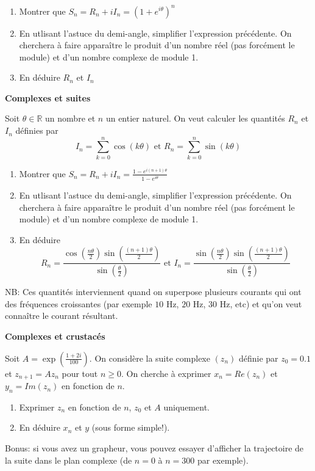 \documentclass[a4paper,12pt]{article}\usepackage[]{graphicx}\usepackage[]{color}
\begin{document}
\begin{enumerate}
\item Montrer que $\displaystyle S_n = R_n + i I_n = (1+e^{i\theta})^n$
\item En utlisant l'astuce du demi-angle, simplifier l'expression précédente. On cherchera à faire apparaître le produit d'un nombre réel (pas forcément le module) et d'un nombre complexe de module 1. 
\item En déduire $R_n$ et $I_n$
\end{enumerate}

\Exo \textbf{Complexes et suites}

Soit $\theta \in \mathbb{R}$ un nombre et $n$ un entier naturel. On veut calculer les quantités $R_n$ et $I_n$ définies par 
\begin{equation*}
I_n  = \sum_{k=0}^n \cos(k\theta) \text{ et } R_n  = \sum_{k=0}^n \sin(k\theta)
\end{equation*}

\begin{enumerate}
\item Montrer que $\displaystyle S_n = R_n + i I_n = \frac{1 - e^{i(n+1)\theta}}{1 - e^{i\theta}}$
\item En utlisant l'astuce du demi-angle, simplifier l'expression précédente. On cherchera à faire apparaître le produit d'un nombre réel (pas forcément le module) et d'un nombre complexe de module 1. 
\item En déduire 
$$ R_n = \frac{\cos\left(\frac{n\theta}{2}\right)\sin\left(\frac{(n+1)\theta}{2}\right)}{\sin\left(\frac{\theta}{2}\right)} \text{ et } I_n = \frac{\sin\left(\frac{n\theta}{2}\right)\sin\left(\frac{(n+1)\theta}{2}\right)}{\sin\left(\frac{\theta}{2}\right)} $$
\end{enumerate}

NB: Ces quantités interviennent quand on superpose plusieurs courants qui ont des fréquences croissantes (par exemple $10$ Hz, $20$ Hz, $30$ Hz, etc) et qu'on veut connaître le courant résultant.

\Exo \textbf{Complexes et crustacés}

Soit $\displaystyle A = \exp\left( \frac{1 + 2i}{100} \right)$. On considère la suite complexe $(z_n)$ définie par $z_0 = 0.1$ et $z_{n+1} = A z_n$ pour tout $n \geq 0$.
On cherche à exprimer $x_n = Re(z_n)$ et $y_n = Im(z_n)$ en fonction de $n$. 
\begin{enumerate}
\item Exprimer $z_n$ en fonction de $n$, $z_0$ et $A$ uniquement. 
\item En déduire $x_n$ et $y$ (sous forme simple!). 
\end{enumerate}


Bonus: si vous avez un grapheur, vous pouvez essayer d'afficher la trajectoire de la suite dans le plan complexe (de $n=0$ à $n=300$ par exemple). 
\end{document}
